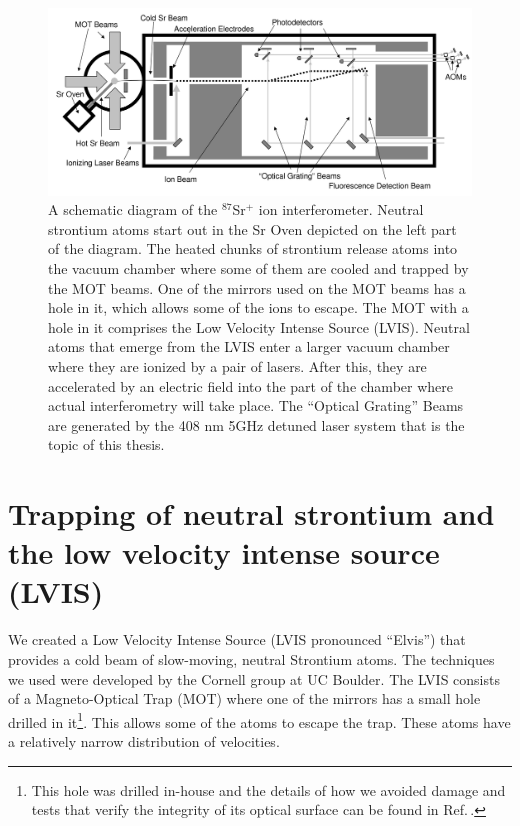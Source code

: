 \begin{figure}
\centerline{
\includegraphics[totalheight=0.3\textheight]{interferometer_diagram}
}
\caption[Ion interferometer]{\label{fig:IonInterferometer}
A schematic diagram of the $^{87}$Sr$^+$ ion interferometer. Neutral strontium atoms start out in the Sr Oven depicted on the left part of the diagram. The heated chunks of strontium release atoms into the vacuum chamber where some of them are cooled and trapped by the MOT beams. One of the mirrors used on the MOT beams has a hole in it, which allows some of the ions to escape. The MOT with a hole in it comprises the Low Velocity Intense Source (LVIS). Neutral atoms that emerge from the LVIS enter a larger vacuum chamber where they are ionized by a pair of lasers. After this, they are accelerated by an electric field into the part of the chamber where actual interferometry will take place. The ``Optical Grating'' Beams are generated by the 408 nm 5GHz detuned laser system that is the topic of this thesis.} 
\end{figure}

\section{Trapping of neutral strontium and the low velocity intense source (LVIS)}

We created a Low Velocity Intense Source (LVIS pronounced ``Elvis'') \cite{cjeDiss} that provides a cold beam of slow-moving, neutral Strontium atoms. The techniques we used were developed by the Cornell group at UC Boulder\cite{LVIS}. The LVIS consists of a Magneto-Optical Trap (MOT) where one of the mirrors has a small hole drilled in it\footnote{This hole was drilled in-house and the details of how we avoided damage and tests that verify the integrity of its optical surface can be found in Ref.\,\cite{cjeDiss}.}. This allows some of the atoms to escape the trap. These atoms have a relatively narrow distribution of velocities. %

